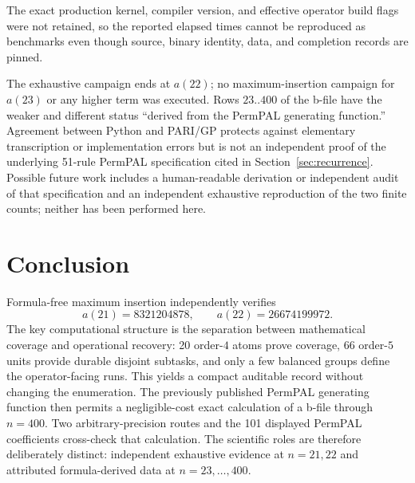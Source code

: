 \documentclass[11pt]{article}
\theoremstyle{definition}
\theoremstyle{remark}
\begin{document}
The exact production kernel, compiler version, and effective operator build
flags were not retained, so the reported elapsed times cannot be reproduced as
benchmarks even though source, binary identity, data, and completion records
are pinned.

The exhaustive campaign ends at $a(22)$; no maximum-insertion campaign for
$a(23)$ or any higher term was executed.  Rows $23..400$ of the b-file have
the weaker and different status ``derived from the PermPAL generating
function.''  Agreement between Python and PARI/GP protects against elementary
transcription or implementation errors but is not an independent proof of the
underlying 51-rule PermPAL specification cited in
Section~\ref{sec:recurrence}.  Possible future work includes
a human-readable derivation or independent audit of that specification and an
independent exhaustive reproduction of the two finite counts; neither has
been performed here.

\section{Conclusion}
\label{sec:conclusion}

Formula-free maximum insertion independently verifies
\[
 a(21)=8321204878,
 \qquad
 a(22)=26674199972.
\]
The key computational structure is the separation between mathematical
coverage and operational recovery: 20 order-$4$ atoms prove coverage, 66
order-$5$ units provide durable disjoint subtasks, and only a few balanced
groups define the operator-facing runs.  This yields a compact auditable
record without changing the enumeration.  The previously published PermPAL
generating function then permits a negligible-cost exact calculation of a
b-file through $n=400$.  Two arbitrary-precision routes and the 101 displayed
PermPAL coefficients cross-check that calculation.  The scientific roles are
therefore deliberately distinct: independent exhaustive evidence at $n=21,22$
and attributed formula-derived data at $n=23,\ldots,400$.
\end{document}
